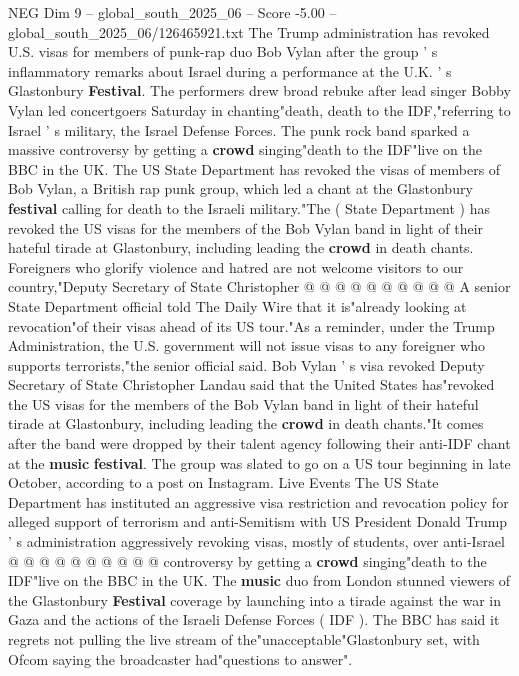 \begin{textsample}{NEG Dim 9 – global\_south\_2025\_06 – Score -5.00 – global\_south\_2025\_06/126465921.txt}  \label{ex:f9_neg_256}
The Trump administration has revoked U.S. visas for members of punk-rap duo Bob Vylan after the group ' s inflammatory remarks about Israel during a performance at the U.K. ' s Glastonbury \textbf{Festival}.
The performers drew broad rebuke after lead singer Bobby Vylan led concertgoers Saturday in chanting"death, death to the IDF,"referring to Israel ' s military, the Israel Defense Forces.
The punk rock band sparked a massive controversy by getting a \textbf{crowd} singing"death to the IDF"live on the BBC in the UK.
The US State Department has revoked the visas of members of Bob Vylan, a British rap punk group, which led a chant at the Glastonbury \textbf{festival} calling for death to the Israeli military."The ( State Department ) has revoked the US visas for the members of the Bob Vylan band in light of their hateful tirade at Glastonbury, including leading the \textbf{crowd} in death chants.
Foreigners who glorify violence and hatred are not welcome visitors to our country,"Deputy Secretary of State Christopher @ @ @ @ @ @ @ @ @ @ A senior State Department official told The Daily Wire that it is"already looking at revocation"of their visas ahead of its US tour."As a reminder, under the Trump Administration, the U.S. government will not issue visas to any foreigner who supports terrorists,"the senior official said.
Bob Vylan ' s visa revoked Deputy Secretary of State Christopher Landau said that the United States has"revoked the US visas for the members of the Bob Vylan band in light of their hateful tirade at Glastonbury, including leading the \textbf{crowd} in death chants."It comes after the band were dropped by their talent agency following their anti-IDF chant at the \textbf{music} \textbf{festival}.
The group was slated to go on a US tour beginning in late October, according to a post on Instagram.
Live Events The US State Department has instituted an aggressive visa restriction and revocation policy for alleged support of terrorism and anti-Semitism with US President Donald Trump ' s administration aggressively revoking visas, mostly of students, over anti-Israel @ @ @ @ @ @ @ @ @ @ controversy by getting a \textbf{crowd} singing"death to the IDF"live on the BBC in the UK.
The \textbf{music} duo from London stunned viewers of the Glastonbury \textbf{Festival} coverage by launching into a tirade against the war in Gaza and the actions of the Israeli Defense Forces ( IDF ).
The BBC has said it regrets not pulling the live stream of the"unacceptable"Glastonbury set, with Ofcom saying the broadcaster had"questions to answer".

\end{textsample}

